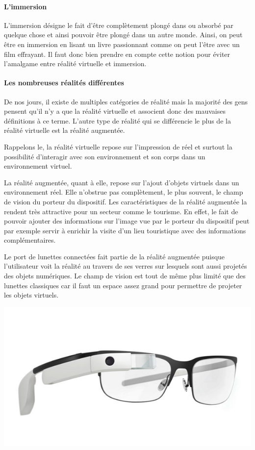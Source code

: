 \documentclass[12pt, a4paper]{report}
\begin{document}
\paragraph{L'immersion}

L'immersion désigne le fait d'être complètement plongé dans ou absorbé par quelque chose et ainsi pouvoir être plongé dans un autre monde. Ainsi, on peut être en immersion en lisant un livre passionnant comme on peut l'être avec un film effrayant. Il faut donc bien prendre en compte cette notion pour éviter l'amalgame entre réalité virtuelle et immersion.

\paragraph{Les nombreuses réalités différentes}

De nos jours, il existe de multiples catégories de réalité mais la majorité des gens pensent qu'il n'y a que la réalité virtuelle et associent donc des mauvaises définitions à ce terme. L'autre type de réalité qui se différencie le plus de la réalité virtuelle est la réalité augmentée.

Rappelons le, la réalité virtuelle repose sur l'impression de réel et surtout la possibilité d'interagir avec son environnement et son corps dans un environnement virtuel.

La réalité augmentée, quant à elle, repose sur l'ajout d'objets virtuels dans un environnement réel. Elle n'obstrue pas complètement, le plus souvent, le champ de vision du porteur du dispositif. Les caractéristiques de la réalité augmentée la rendent très attractive pour un secteur comme le tourisme. En effet, le fait de pouvoir ajouter des informations sur l'image vue par le porteur du dispositif peut par exemple servir à enrichir la visite d'un lieu touristique avec des informations complémentaires.

Le port de lunettes connectées fait partie de la réalité augmentée puisque l'utilisateur voit la réalité au travers de ses verres sur lesquels sont aussi projetés des objets numériques. Le champ de vision est tout de même plus limité que des lunettes classiques car il faut un espace assez grand pour permettre de projeter les objets virtuels.

\begin{center}
\includegraphics[scale=0.3]{glass.png}
\end{center}
\end{document}
